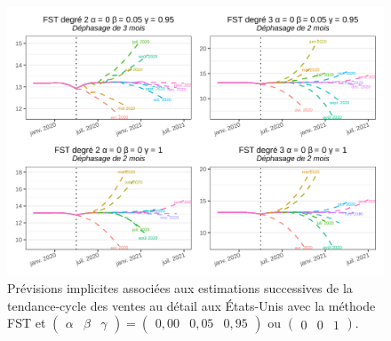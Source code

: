 \documentclass[
  12pt,
  french,
  12pt,a4paper]{article}
\newcommand\1{\mathds{1}}
\begin{document}
\begin{figure}

{\centering \includegraphics[width=0.9\linewidth]{img/nber/retailx_fstp2_implicit_forecast} 

}

\caption[Prévisions implicites associées aux estimations successives de la tendance-cycle des ventes au détail aux États-Unis avec la méthode FST et \(\begin{pmatrix}\alpha&\beta&\gamma\end{pmatrix} =\begin{pmatrix}0,00 &0,05&0,95\end{pmatrix}\) ou \(\begin{pmatrix}0 &0&1\end{pmatrix}\)]{Prévisions implicites associées aux estimations successives de la tendance-cycle des ventes au détail aux États-Unis avec la méthode FST et \(\begin{pmatrix}\alpha&\beta&\gamma\end{pmatrix} =\begin{pmatrix}0,00 &0,05&0,95\end{pmatrix}\) ou \(\begin{pmatrix}0 &0&1\end{pmatrix}\).}\label{fig:retailxipfst2}

\footnotesize
\normalsize\end{figure}

\newpage

\printbibliography[heading=bibintoc]
\end{document}
